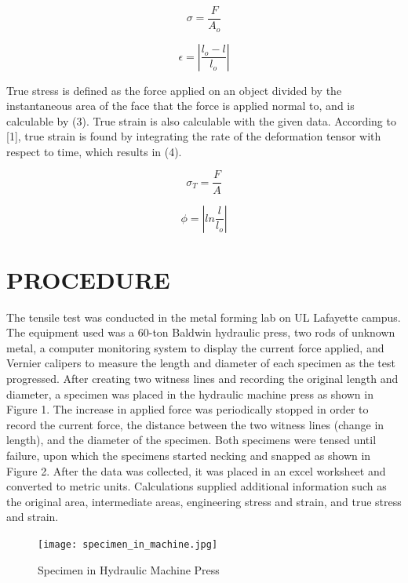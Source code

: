 \documentclass[12pt]{article}
\begin{document}
\bigskip
\begin{equation}
\sigma = \frac{F}{A_{o}}
\end{equation}
\bigskip

\bigskip
\begin{equation}
\epsilon = \left | \frac{l_{o}-l}{l_{o}} \right |
\end{equation}
\bigskip

True stress is defined as the force applied on an object divided by the instantaneous area of the face that the force is applied normal to, and is calculable by (3). True strain is also calculable with the given data. According to [1], true strain is found by integrating the rate of the deformation tensor with respect to time, which results in (4).

\begin{equation}
\sigma_{T} = \frac {F}{A}
\end{equation}

\begin{equation}
\phi = \left | ln \frac{l}{l_{o}} \right |
\end{equation}
\bigskip


\bigskip


\section*{\fontsize{12}{12}\selectfont PROCEDURE}
The tensile test was conducted in the metal forming lab on UL Lafayette campus. The equipment used was a 60-ton Baldwin hydraulic press, two rods of unknown metal, a computer monitoring system to display the current force applied, and Vernier calipers to measure the length and diameter of each specimen as the test progressed. After creating two witness lines and recording the original length and diameter, a specimen was placed in the hydraulic machine press as shown in Figure 1. The increase in applied force was periodically stopped in order to record the current force, the distance between the two witness lines (change in length), and the diameter of the specimen. Both specimens were tensed until failure, upon which the specimens started necking and snapped as shown in Figure 2. After the data was collected, it was placed in an excel worksheet and converted to metric units. Calculations supplied additional information such as the original area, intermediate areas, engineering stress and strain, and true stress and strain.
\bigskip
\bigskip

\begin{figure}[h!]  
  \centering
    \texttt{[image: specimen\_in\_machine.jpg]}
    \caption{Specimen in Hydraulic Machine Press}
\end{figure}
\end{document}
